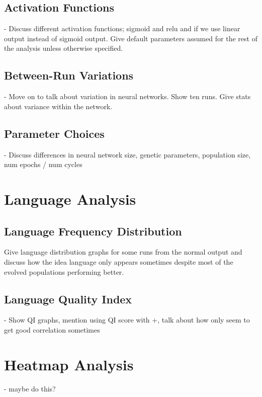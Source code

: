 \documentclass[12pt,a4paper,twoside,openright]{report}
\begin{document}
 \subsection{Activation Functions}
 
 - Discuss different activation functions; sigmoid and relu and if we use linear output instead of sigmoid output. Give default parameters assumed for the rest of the analysis unless otherwise specified.
 
 \subsection{Between-Run Variations}
 
 - Move on to talk about variation in neural networks. Show ten runs. Give stats about variance within the network.
 
 \subsection{Parameter Choices}
 
 - Discuss differences in neural network size, genetic parameters, population size, num epochs / num cycles

\section{Language Analysis}

\subsection{Language Frequency Distribution}

Give language distribution graphs for some runs from the normal output and discuss how the idea language only appears sometimes despite most of the evolved populations performing better.

\subsection{Language Quality Index}

- Show QI graphs, mention using QI score with +, talk about how only seem to get good correlation sometimes

\section{Heatmap Analysis}

- maybe do this?
\end{document}
